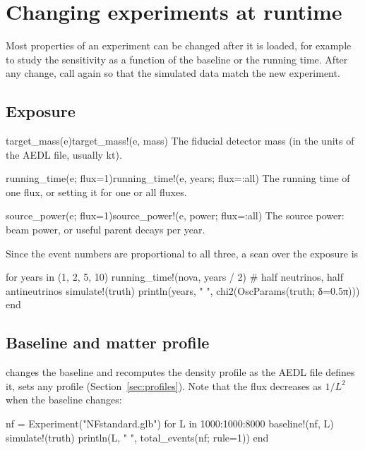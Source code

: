 \chapter{Changing experiments at runtime}\label{ch:runtime}

Most properties of an experiment can be changed after it is loaded, for
example to study the sensitivity as a function of the baseline or the running
time. After any change, call  again so that the simulated data
match the new experiment.

\section{Exposure}\label{sec:exposure}

\begin{apifun}{target\_mass(e)\qquad target\_mass!(e, mass)}
The fiducial detector mass (in the units of the AEDL file, usually kt).
\end{apifun}
\begin{apifun}{running\_time(e; flux=1)\qquad running\_time!(e, years; flux=:all)}
The running time of one flux, or setting it for one or all fluxes.
\end{apifun}
\begin{apifun}{source\_power(e; flux=1)\qquad source\_power!(e, power; flux=:all)}
The source power: beam power, or useful parent decays per year.
\end{apifun}

\noindent Since the event numbers are proportional to all three, a scan over
the exposure is
\begin{julia}
for years in (1, 2, 5, 10)
    running_time!(nova, years / 2)            # half neutrinos, half antineutrinos
    simulate!(truth)
    println(years, "  ", chi2(OscParams(truth; δ=0.5π)))
end
\end{julia}

\section{Baseline and matter profile}

 changes the baseline and recomputes the density profile
as the AEDL file defines it, 
sets any profile (Section~\ref{sec:profiles}). Note that the flux decreases as
$1/L^2$ when the baseline changes:
\begin{julia}
nf = Experiment("NFstandard.glb")
for L in 1000:1000:8000
    baseline!(nf, L)
    simulate!(truth)
    println(L, "  ", total_events(nf; rule=1))
end
\end{julia}

